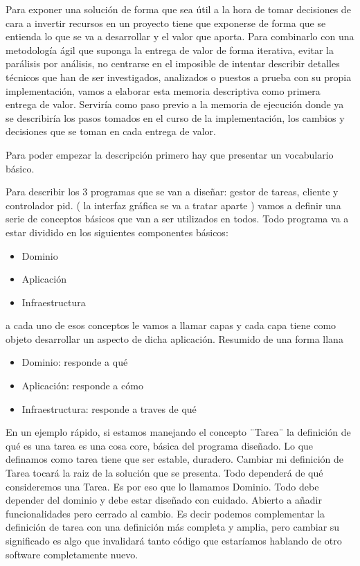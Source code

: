 Para exponer una solución de forma que sea útil a la hora de tomar decisiones de cara a invertir recursos en un proyecto tiene que exponerse de forma que se entienda lo que se va a desarrollar y el valor que aporta. Para combinarlo con una metodología ágil que suponga la entrega de valor de forma iterativa, evitar la parálisis por análisis, no centrarse en el imposible de intentar describir detalles técnicos que han de ser investigados, analizados o puestos a prueba con su propia implementación, vamos a elaborar esta memoria descriptiva como primera entrega de valor. Serviría como paso previo a la memoria de ejecución donde ya se describiría los pasos tomados en el curso de la implementación, los cambios y decisiones que se toman en cada entrega de valor.

Para poder empezar la descripción primero hay que presentar un vocabulario básico.

Para describir los 3 programas que se van a diseñar: gestor de tareas, cliente y controlador pid. ( la interfaz gráfica se va a tratar aparte ) vamos a definir una serie de conceptos básicos que van a ser utilizados en todos. Todo programa va a estar dividido en los siguientes componentes básicos:

\begin{itemize}
    \item Dominio
    \item Aplicación
    \item Infraestructura
\end{itemize}

a cada uno de esos conceptos le vamos a llamar capas y cada capa tiene como objeto desarrollar un aspecto de dicha aplicación. Resumido de una forma llana

\begin{itemize}
    \item Dominio: responde a qué
    \item Aplicación: responde a cómo
    \item Infraestructura: responde a traves de qué
\end{itemize}

En un ejemplo rápido, si estamos manejando el concepto ¨Tarea¨ la definición de qué es una tarea es una cosa core, básica del programa diseñado. Lo que definamos como tarea tiene que ser estable, duradero. Cambiar mi definición de Tarea tocará la raiz de la solución que se presenta. Todo dependerá de qué consideremos una Tarea. Es por eso que lo llamamos Dominio. Todo debe depender del dominio y debe estar diseñado con cuidado. Abierto a añadir funcionalidades pero cerrado al cambio. Es decir podemos complementar la definición de tarea con una definición más completa y amplia, pero cambiar su significado es algo que invalidará tanto código que estaríamos hablando de otro software completamente nuevo.


